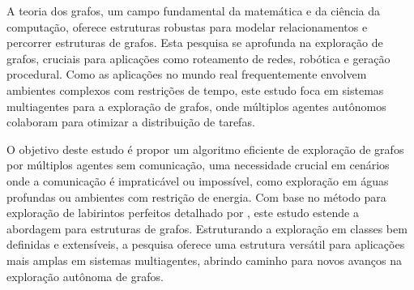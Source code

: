 A teoria dos grafos,
um campo fundamental da matemática e da ciência da computação,
oferece estruturas robustas para modelar relacionamentos e percorrer estruturas de grafos.
Esta pesquisa se aprofunda na exploração de grafos,
cruciais para aplicações como roteamento de redes,
robótica e geração procedural.
Como as aplicações no mundo real frequentemente envolvem ambientes complexos com restrições de tempo,
este estudo foca em sistemas multiagentes para a exploração de grafos,
onde múltiplos agentes autônomos colaboram para otimizar a distribuição de tarefas.

O objetivo deste estudo é propor um algoritmo eficiente de exploração de grafos por múltiplos agentes sem comunicação,
uma necessidade crucial em cenários onde a comunicação é impraticável ou impossível,
como exploração em águas profundas ou ambientes com restrição de energia.
Com base no método para exploração de labirintos perfeitos detalhado por ,
este estudo estende a abordagem para estruturas de grafos.
Estruturando a exploração em classes bem definidas e extensíveis,
a pesquisa oferece uma estrutura versátil para aplicações mais amplas em sistemas multiagentes,
abrindo caminho para novos avanços na exploração autônoma de grafos.